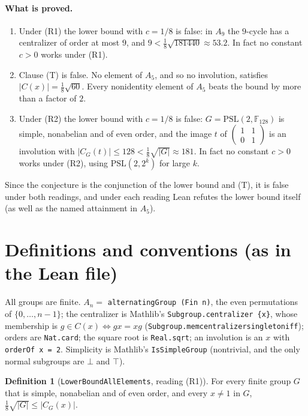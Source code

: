 \documentclass[11pt]{article}
\theoremstyle{definition}
\newtheorem{definition}[theorem]{Definition}
\theoremstyle{remark}
\renewcommand{\_}{\oldus\allowbreak}
\begin{document}
\paragraph{What is proved.}
\begin{enumerate}[leftmargin=2em]
\item Under (R1) the lower bound with $c=1/8$ is false: in $A_9$ the $9$-cycle has a centralizer of order at
most $9$, and $9<\tfrac18\sqrt{181440}\approx 53.2$. In fact no constant $c>0$ works under (R1).
\item Clause (T) is false. No element of $A_5$, and so no involution, satisfies $|C(x)|=\tfrac18\sqrt{60}$.
Every nonidentity element of $A_5$ beats the bound by more than a factor of $2$.
\item Under (R2) the lower bound with $c=1/8$ is false: $G=\mathrm{PSL}(2,\mathbb F_{128})$ is simple,
nonabelian and of even order, and the image $t$ of $\begin{pmatrix}1&1\\0&1\end{pmatrix}$ is an involution with
$|C_G(t)|\le128<\tfrac18\sqrt{|G|}\approx181$. In fact no constant $c>0$ works under (R2), using
$\mathrm{PSL}(2,2^k)$ for large $k$.
\end{enumerate}
Since the conjecture is the conjunction of the lower bound and (T), it is false under both readings, and
under each reading Lean refutes the lower bound itself (as well as the named attainment in $A_5$).

\section{Definitions and conventions (as in the Lean file)}

All groups are finite. $A_n=$ \texttt{alternatingGroup (Fin n)}, the even permutations of
$\{0,\dots,n-1\}$; the centralizer is Mathlib's \texttt{Subgroup.centralizer \{x\}}, whose membership is
$g\in C(x)\iff gx=xg$ (\texttt{Subgroup.mem\_centralizer\_singleton\_iff}); orders are \texttt{Nat.card};
the square root is \texttt{Real.sqrt}; an involution is an $x$ with \texttt{orderOf x = 2}. Simplicity is Mathlib's \texttt{IsSimpleGroup} (nontrivial, and the
only normal subgroups are $\bot$ and $\top$).

\begin{definition}[\texttt{LowerBoundAllElements}, reading (R1)]
For every finite group $G$ that is simple, nonabelian and of even order, and every $x\ne 1$ in $G$,
$\tfrac18\sqrt{|G|}\le |C_G(x)|$.
\end{definition}
\end{document}
